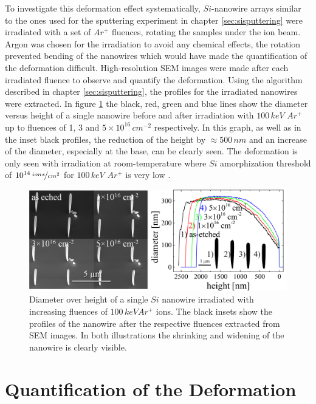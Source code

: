 To investigate this deformation effect systematically, $Si$-nanowire arrays similar to the ones used for the sputtering experiment in chapter \ref{sec:sisputtering} were irradiated with a set of $Ar^+$ fluences, rotating the samples under the ion beam. Argon was chosen for the irradiation to avoid any chemical effects, the rotation prevented bending of the nanowires which would have made the quantification of the deformation difficult.  High-resolution SEM images were made after each irradiated fluence to observe and quantify the deformation. Using the algorithm described in chapter \ref{sec:sisputtering}, the profiles for the irradiated nanowires were extracted. In figure \ref{deformationprofile} the black, red, green and blue lines show the diameter versus height of a single nanowire before and after irradiation with $100\,keV\,\,Ar^+$ up to fluences of 1, 3 and $5 \times 10^{16}\,cm^{-2}$ respectively. In this graph, as well as in the inset black profiles, the reduction of the height by $\approx 500\,nm$ and an increase of the diameter, especially at the base, can be clearly seen. The deformation is only seen with irradiation at room-temperature where $Si$ amorphization threshold of $10^{14}\,\nicefrac{ions}{cm^2}$ for $100\,keV\,\,Ar^+$ is very low \cite{pelaz_ion-beam-induced_2004}.

\begin{figure}[thbp]
	\centering
		\includegraphics[width=.8\textwidth]{images/deformationprofileandSEM.jpg}
		\caption{Diameter over height of a single $Si$ nanowire irradiated with increasing fluences of $100\,keV Ar^+$ ions. The black insets show the profiles of the nanowire after the respective fluences extracted from SEM images. In both illustrations the shrinking and widening of the nanowire is clearly visible.} 
	\label{deformationprofile} 
\end{figure}


\section{Quantification of the Deformation}
\label{sec:quantifydeformation}

